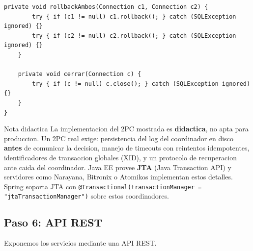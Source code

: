 \documentclass[11pt,a4paper]{article}
\begin{document}
\begin{lstlisting}[style=JavaStyle,caption={TransferenciaService.java: simulacion didactica de 2PC en capa de aplicacion}]
    private void rollbackAmbos(Connection c1, Connection c2) {
        try { if (c1 != null) c1.rollback(); } catch (SQLException ignored) {}
        try { if (c2 != null) c2.rollback(); } catch (SQLException ignored) {}
    }

    private void cerrar(Connection c) {
        try { if (c != null) c.close(); } catch (SQLException ignored) {}
    }
}
\end{lstlisting}

\begin{notebox}{Nota didactica}
La implementacion del 2PC mostrada es \textbf{didactica}, no apta para produccion. Un 2PC real exige: persistencia del log del coordinador en disco \textbf{antes} de comunicar la decision, manejo de timeouts con reintentos idempotentes, identificadores de transaccion globales (XID), y un protocolo de recuperacion ante caida del coordinador. Java EE provee \textbf{JTA} (Java Transaction API) y servidores como Narayana, Bitronix o Atomikos implementan estos detalles. Spring soporta JTA con \texttt{@Transactional(transactionManager = "jtaTransactionManager")} sobre estos coordinadores.
\end{notebox}

\subsection{Paso 6: API REST}

Exponemos los servicios mediante una API REST.
\end{document}
